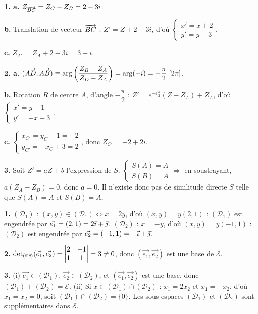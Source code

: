 \documentclass[11pt]{article}
\begin{document}

\textbf{1. a.} $Z_{\overrightarrow{BC}} = Z_C - Z_B = 2 - 3i$.

\textbf{b.} Translation de vecteur $\overrightarrow{BC}$ : $Z' = Z + 2 - 3i$, d'où $\begin{cases} x' = x + 2 \\ y' = y - 3 \end{cases}$.

\textbf{c.} $Z_{A'} = Z_A + 2 - 3i = 3 - i$.

\textbf{2. a.} $(\overrightarrow{AD}, \overrightarrow{AB}) \equiv \arg\left(\dfrac{Z_B - Z_A}{Z_D - Z_A}\right) = \arg(-i) = -\dfrac{\pi}{2}\ [2\pi]$.

\textbf{b.} Rotation $R$ de centre $A$, d'angle $-\dfrac{\pi}{2}$ : $Z' = e^{-i\frac{\pi}{2}}(Z - Z_A) + Z_A$, d'où $\begin{cases} x' = y - 1 \\ y' = -x + 3 \end{cases}$.

\textbf{c.} $\begin{cases} x_{C'} = y_C - 1 = -2 \\ y_{C'} = -x_C + 3 = 2 \end{cases}$, donc $Z_{C'} = -2 + 2i$.

\textbf{3.} Soit $Z' = aZ + b$ l'expression de $S$. $\begin{cases} S(A) = A \\ S(B) = A \end{cases} \Rightarrow$ en soustrayant, $a(Z_A - Z_B) = 0$, donc $a = 0$. Il n'existe donc pas de similitude directe $S$ telle que $S(A) = A$ et $S(B) = A$.

\textbf{1.} \underline{$(\mathcal{D}_1)$ :} $(x,y) \in (\mathcal{D}_1) \Leftrightarrow x = 2y$, d'où $(x,y) = y(2,1)$ : $(\mathcal{D}_1)$ est engendrée par $\vec{e_1} = (2,1) = 2\vec{\imath} + \vec{\jmath}$. \underline{$(\mathcal{D}_2)$ :} $x = -y$, d'où $(x,y) = y(-1,1)$ : $(\mathcal{D}_2)$ est engendrée par $\vec{e_2} = (-1,1) = -\vec{\imath} + \vec{\jmath}$.

\textbf{2.} $\det_{(\vec{\imath},\vec{\jmath})}(\vec{e_1}, \vec{e_2}) = \begin{vmatrix} 2 & -1 \\ 1 & 1 \end{vmatrix} = 3 \ne 0$, donc $(\vec{e_1}, \vec{e_2})$ est une base de $\mathscr{E}$.

\textbf{3.} (i) $\vec{e_1} \in (\mathcal{D}_1)$, $\vec{e_2} \in (\mathcal{D}_2)$, et $(\vec{e_1}, \vec{e_2})$ est une base, donc $(\mathcal{D}_1) + (\mathcal{D}_2) = \mathscr{E}$. (ii) Si $x \in (\mathcal{D}_1)\cap(\mathcal{D}_2)$ : $x_1 = 2x_2$ et $x_1 = -x_2$, d'où $x_1 = x_2 = 0$, soit $(\mathcal{D}_1)\cap(\mathcal{D}_2) = \{0\}$. Les sous-espaces $(\mathcal{D}_1)$ et $(\mathcal{D}_2)$ sont supplémentaires dans $\mathscr{E}$.
\end{document}
